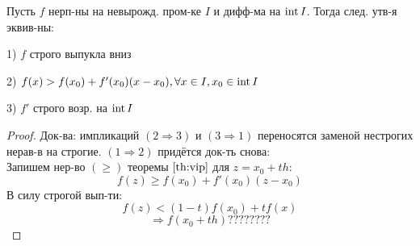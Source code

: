 \begin{theorem}
  \label{16s}
Пусть $f$ нерп-ны на невырожд. пром-ке $I$ и дифф-ма на $\operatorname{int} I$. Тогда след. утв-я эквив-ны:
  \item [1) ]$f$ строго выпукла вниз 
  \item [2) ]$f(x) > f(x_0) + f'(x_0)(x - x_0), \forall x \in I, x_0 \in \operatorname{int} I$
  \item [3) ] $f'$ строго возр. на $\operatorname{int} I$
\end{theorem}
\begin{proof}
Док-ва: импликаций $(2 \Rightarrow 3)$ и $(3 \Rightarrow 1)$ переносятся заменой нестрогих нерав-в на строгие. $(1 \Rightarrow 2)$ придётся док-ть снова: \\
Запишем нер-во $(\geq)$ теоремы $\ref{th:vip}$ для $z = x_0 + t h$:
\[
f(z) \geq f(x_0) + f'(x_0) (z - x_0)
\]
В силу строгой вып-ти:
\[
f(z) < (1 - t)f(x_0) + tf(x)
\]
\[
\Rightarrow f(x_0 + t h) ????????
\]
\end{proof}
